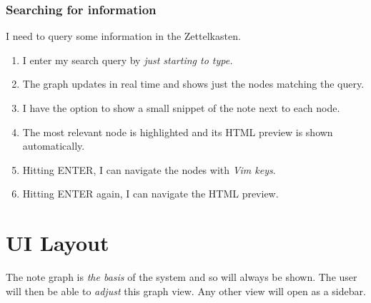 \documentclass{article}
\begin{document}
\subsubsection{Searching for information}

I need to query some information in the Zettelkasten.

\begin{enumerate}
	\item I enter my search query by \emph{just starting to type.}

	\item The graph updates in real time and shows just the nodes matching the query. 

	\item I have the option to show a small snippet of the note next to each node.

	\item The most relevant node is highlighted and its HTML preview is shown automatically.

	\item Hitting ENTER, I can navigate the nodes with \emph{Vim keys}.

	\item Hitting ENTER again, I can navigate the HTML preview.
\end{enumerate}

\newpage

\section{UI Layout}\label{sec:ui_layout}

The note graph is \emph{the basis} of the system and so will always be shown. The user will then be able to \emph{adjust} this graph view. Any other view will open as a sidebar.

\newcommand{\drawborder}{
	\node[fit={(0,0) (\linewidth, 0.5625\linewidth)}, draw=black, thick, outer sep=0](border){};
}

\newcommand{\uicontainer}[3]{
	\node[fit={#1 #2}, inner sep=0, outer sep=0](#3){};
}

\newcommand{\uielement}[5]{
	\uicontainer{#1}{#2}{#4}

	\node[fit={(#4.north west) (#4.south east)}, draw=#3, fill=#3, fill opacity=0.2, thick, inner sep=-0.3]{};
	\node[text=#3] at (#4){#5};
}
\end{document}
